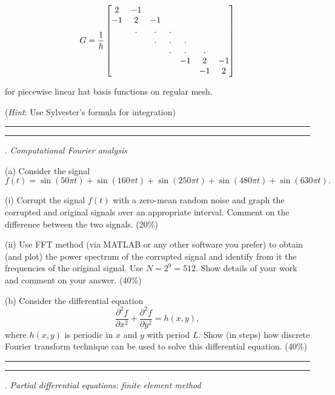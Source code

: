 \documentclass [11point]{article}
\begin{document}
$$G={1\over h} \left[ \begin{matrix} 2 & -1 & & & & & \\
-1 & 2 & -1 &  & & &  \\
  & . & . & . & & &  \\
  &   & . & . & . & &  \\
  &   &   & . & . & . &  \\
  &   &   &   & -1 & 2 & -1  \\
  &   &   &   &   & -1 & 2 \end{matrix} \right]$$

\noindent for piecewise linear hat basis functions on regular mesh.\smallskip

(\textit{Hint}: Use Sylvester's formula for integration)\bigskip

\bigskip 
\hrule 



\pagebreak
\hrule 
{}. \textit{Computational Fourier analysis}
\bigskip

(a) Consider the signal $$f(t) = \sin\left( 50 \pi t \right) + \sin \left(160 \pi t \right) + \sin \left(250 \pi t \right) + \sin \left(480 \pi t \right) + \sin \left(630 \pi t \right).$$ 

\medskip

(i) Corrupt the signal $f(t)$ with a zero-mean random noise and graph the corrupted and original signals over an appropriate interval. Comment on the difference between the two signals. (20\%)

\medskip

(ii) Use FFT method (via MATLAB or any other software you prefer) to obtain (and plot) the power spectrum of the corrupted signal and identify from it the frequencies of the original signal. Use $ N = 2^9 = 512$. Show details of your work and comment on your answer. (40\%)

\bigskip

(b) Consider the differential equation $$\frac{\partial^2f}{\partial x^2}+ \frac{\partial^2f}{\partial y^2} = h(x,y),$$ where $h(x,y)$ is periodic in $x$ and $y$ with period $L$. Show (in steps) how discrete Fourier transform technique can be used to solve this differential equation. (40\%)

\bigskip

\hrule 






\pagebreak
\hrule 
{}. \textit{Partial differential equations: finite element method}
\bigskip
\end{document}

